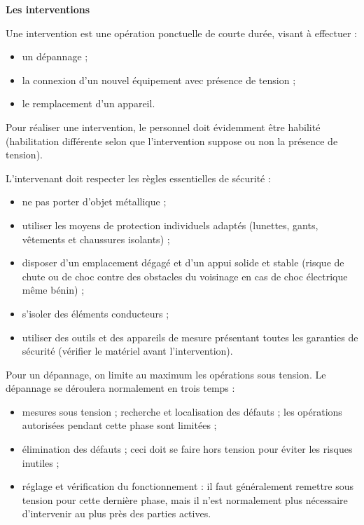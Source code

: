 \vspace{0.3cm}
\textbf{Les interventions}
\vspace{0.3cm}

Une intervention est une opération ponctuelle de courte durée, visant à effectuer :
\begin{itemize}

\item  un dépannage ;
\item  la connexion d’un nouvel équipement avec présence de tension ;
\item  le remplacement d’un appareil.

\end{itemize}

Pour réaliser une intervention, le personnel doit évidemment être habilité (habilitation différente selon que l’intervention suppose ou non la présence de tension).

L’intervenant doit respecter les règles essentielles de sécurité :

\begin{itemize}

\item  ne pas porter d’objet métallique ;
\item  utiliser les moyens de protection individuels adaptés (lunettes, gants, vêtements et chaussures isolants) ;
\item  disposer d’un emplacement dégagé et d’un appui solide et stable (risque de chute ou de choc contre des obstacles du voisinage en cas de choc électrique même bénin) ;
\item  s’isoler des éléments conducteurs ;
\item  utiliser des outils et des appareils de mesure présentant toutes les garanties de sécurité (vérifier le matériel avant l’intervention).

\end{itemize}


Pour un dépannage, on limite au maximum les opérations sous tension. Le dépannage se déroulera normalement en trois temps :
\begin{itemize}

\item  mesures sous tension ; recherche et localisation des défauts ; les opérations autorisées pendant cette phase sont limitées ;
\item  élimination des défauts ; ceci doit se faire hors tension pour éviter les risques inutiles ;
\item  réglage et vérification du fonctionnement : il faut généralement remettre sous tension pour cette dernière phase, mais il n’est normalement plus nécessaire d’intervenir au plus près des parties actives.

\end{itemize}



